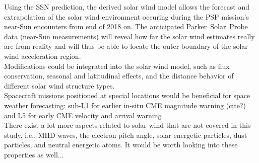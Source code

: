 Using the SSN prediction, the derived solar wind model allows the forecast and extrapolation of the solar wind environment occuring during the PSP mission's near-Sun encounters from end of 2018 on. The anticipated Parker~Solar~Probe data (near-Sun measurements) will reveal how far the solar wind estimates really are from reality and will thus be able to locate the outer boundary of the solar wind acceleration region.\\

Modifications could be integrated into the solar wind model, such as flux conservation, seasonal and latitudinal effects, and the distance behavior of different solar wind structure types.\\

Spacecraft missions positioned at special locations would be beneficial for space weather forecasting: sub-L1 for earlier in-situ CME magnitude warning (cite?) and L5 for early CME velocity and arrival warning \citep{Vourlidas2015}\\

There exist a lot more aspects related to solar wind that are not covered in this study, i.e., MHD waves, the electron pitch angle, solar energetic particles, dust particles, and neutral energetic atoms. It would be worth looking into these properties as well...\\







